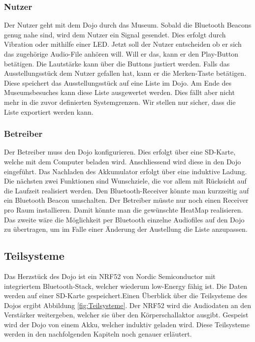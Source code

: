 \subsubsection*{Nutzer}
Der Nutzer geht mit dem Dojo durch das Museum. Sobald die Bluetooth Beacons genug nahe sind, wird dem Nutzer ein Signal gesendet. Dies erfolgt durch Vibration oder mithilfe einer LED. Jetzt soll der Nutzer entscheiden ob er sich das zugehörige Audio-File anhören will. Will er das, kann er den Play-Button betätigen. Die Lautstärke kann über die Buttons justiert werden. Falls das Ausstellungsstück dem Nutzer gefallen hat, kann er die Merken-Taste betätigen. Diese speichert das Ausstellungsstück auf eine Liste im Dojo. Am Ende des Museumsbesuches kann diese Liste ausgewertet werden. Dies fällt aber nicht mehr in die zuvor definierten Systemgrenzen. Wir stellen nur sicher, dass die Liste exportiert werden kann.
\subsubsection*{Betreiber}
Der Betreiber muss den Dojo konfigurieren. Dies erfolgt über eine SD-Karte, welche mit dem Computer beladen wird. Anschliessend wird diese in den Dojo eingeführt. Das Nachladen des Akkumulator erfolgt über eine induktive Ladung. Die nächsten zwei Funktionen sind Wunschziele, die vor allem mit Rücksicht auf die Laufzeit realisiert werden. Den Bluetooth-Receiver könnte man kurzzeitig auf ein Bluetooth Beacon umschalten. Der Betreiber müsste nur noch einen Receiver pro Raum installieren. Damit könnte man die gewünschte HeatMap realisieren. Das zweite wäre die Möglichkeit per Bluetooth einzelne Audiofiles auf den Dojo zu übertragen, um im Falle einer Änderung der Austellung die Liste anzupassen.

\subsection{Teilsysteme}
Das Herzstück des Dojo ist ein NRF52 von Nordic Semiconductor mit integriertem Bluetooth-Stack, welcher wiederum low-Energy fähig ist. Die Daten werden auf einer SD-Karte gespeichert.Einen Überblick über die Teilsysteme des Dojos ergibt Abbildung \ref{fig:Teilsysteme}. Der NRF52 wird die Audiodaten an den Verstärker weitergeben, welcher sie über den Körperschallaktor ausgibt. Gespeist wird der Dojo von einem Akku, welcher induktiv geladen wird. Diese Teilsysteme werden in den nachfolgenden Kapiteln noch genauer erläutert.

